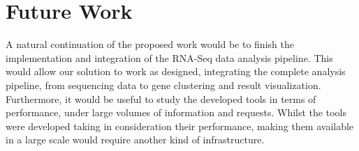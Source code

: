 \section{Future Work}

A natural continuation of the proposed work would be to finish the
implementation and integration of the RNA-Seq data analysis pipeline. This would
allow our solution to work as designed, integrating the complete analysis
pipeline, from sequencing data to gene clustering and result visualization.
Furthermore, it would be useful to study the developed tools in terms of
performance, under large volumes of information and requests. Whilst the tools
were developed taking in consideration their performance, making them available
in a large scale would require another kind of infrastructure.
